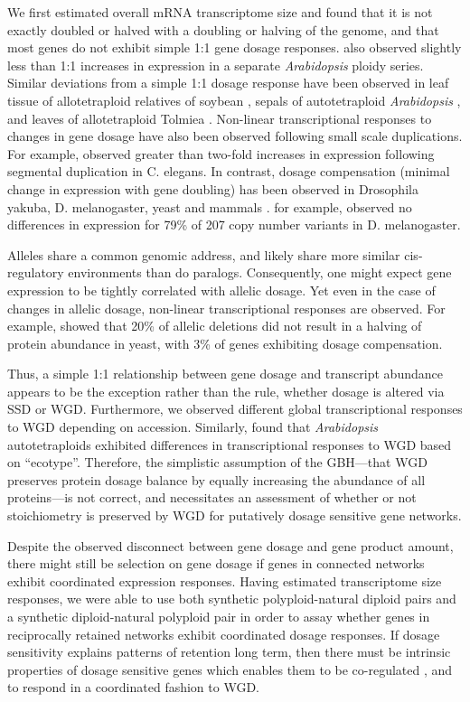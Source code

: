 \documentclass[11pt]{article}
\begin{document}
We first estimated overall mRNA transcriptome size and found that it is not exactly doubled or halved with a doubling or halving of the genome, and that most genes do not exhibit simple 1:1 gene dosage responses. \cite{hou2018} also observed slightly less than 1:1 increases in expression in a separate {\it Arabidopsis} ploidy series. Similar deviations from a simple 1:1 dosage response have been observed in leaf tissue of allotetraploid relatives of soybean \citep{coate2010}, sepals of autotetraploid {\it Arabidopsis} \citep{robinson2018}, and leaves of allotetraploid Tolmiea \citep{visger2019}. 
Non-linear transcriptional responses to changes in gene dosage have also been observed following small scale duplications. For example, \cite{konrad2018} observed greater than two-fold increases in expression following segmental duplication in C. elegans. In contrast, dosage compensation (minimal change in expression with gene doubling) has been observed in Drosophila yakuba, D. melanogaster, yeast and mammals \citep{qian2010, rogers2018, zhou2011}. \cite{zhou2011} for example, observed no differences in expression for 79\% of 207 copy number variants in D. melanogaster. 

Alleles share a common genomic address, and likely share more similar cis-regulatory environments than do paralogs. Consequently, one might expect gene expression to be tightly correlated with allelic dosage. Yet even in the case of changes in allelic dosage, non-linear transcriptional responses are observed. For example, \cite{springer2010} showed that 20\% of allelic deletions did not result in a halving of protein abundance in yeast, with 3\% of genes exhibiting dosage compensation. 

Thus, a simple 1:1 relationship between gene dosage and transcript abundance appears to be the exception rather than the rule, whether dosage is altered via SSD or WGD. Furthermore, we observed different global transcriptional responses to WGD depending on accession. Similarly, \cite{yu2010} found that {\it Arabidopsis} autotetraploids exhibited differences in transcriptional responses to WGD based on ``ecotype''. Therefore, the simplistic assumption of the GBH---that WGD preserves protein dosage balance by equally increasing the abundance of all proteins---is not correct, and necessitates an assessment of whether or not stoichiometry is preserved by WGD for putatively dosage sensitive gene networks.

Despite the observed disconnect between gene dosage and gene product amount, there might still be selection on gene dosage if genes in connected networks exhibit coordinated expression responses. Having estimated transcriptome size responses, we were able to use both synthetic polyploid-natural diploid pairs and a synthetic diploid-natural polyploid pair in order to assay whether genes in reciprocally retained networks exhibit coordinated dosage responses. If dosage sensitivity explains patterns of retention long term, then there must be intrinsic properties of dosage sensitive genes which enables  them to be co-regulated \citep{papp2003}, and to respond in a coordinated fashion to WGD.
\end{document}
